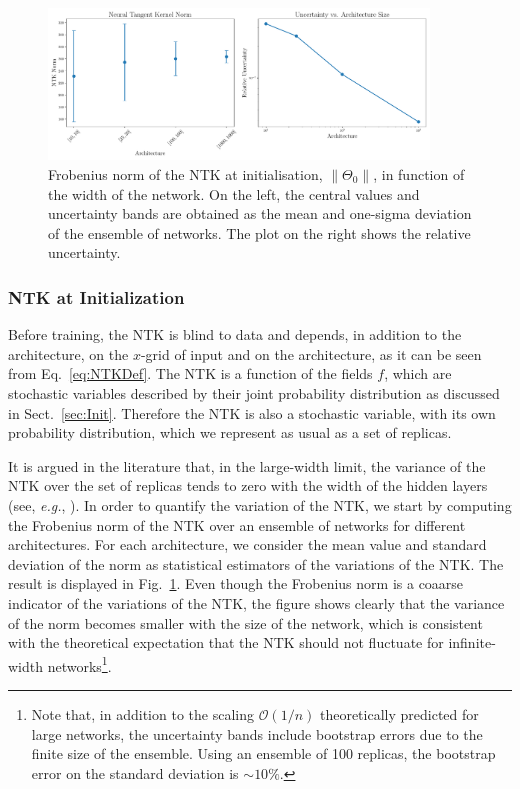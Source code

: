 \begin{figure}[t!]
  \centering
  \includegraphics[width=0.90\textwidth]{figs/section_3/ntk_initialization_with_uncertainty.pdf}
  \caption{Frobenius norm of the NTK at initialisation, $\lVert \Theta_0
  \rVert$, in function of the width of the network. On the left, the central
  values and uncertainty bands are obtained as the mean and one-sigma deviation
  of the ensemble of networks. The plot on the right shows the relative
  uncertainty.}
  \label{fig:NTKInit}
\end{figure}

\subsubsection{NTK at Initialization}
\label{sec:NTKAtInit}

Before training, the NTK is blind to data and depends, in addition to the
architecture, on the $x$-grid of input and on the architecture, as it can be
seen from Eq.~\eqref{eq:NTKDef}. The NTK is a function of the fields $f$, which
are stochastic variables described by their joint probability distribution as
discussed in Sect.~\ref{sec:Init}. Therefore the NTK is also a stochastic
variable, with its own probability distribution, which we represent as usual as
a set of replicas. 

It is argued in the literature that, in the large-width limit, the variance of
the NTK over the set of replicas tends to zero with the width of the hidden
layers (see, \textit{e.g.}, \cite{Roberts:2021fes}). In order to quantify the
variation of the NTK, we start by computing the Frobenius norm of the NTK over
an ensemble of networks for different architectures. For each architecture, we
consider the mean value and standard deviation of the norm as statistical
estimators of the variations of the NTK. The result is displayed in
Fig.~\ref{fig:NTKInit}. Even though the Frobenius norm is a coaarse indicator of
the variations of the NTK, the figure shows clearly that the variance of the
norm becomes smaller with the size of the network, which is consistent with the
theoretical expectation that the NTK should not fluctuate for infinite-width
networks\footnote{Note that, in addition to the scaling $\mathcal{O}(1/n)$
theoretically predicted for large networks, the uncertainty bands include
bootstrap errors due to the finite size of the ensemble. Using an ensemble of
100 replicas, the bootstrap error on the standard deviation is $\sim 10\%$.}.


